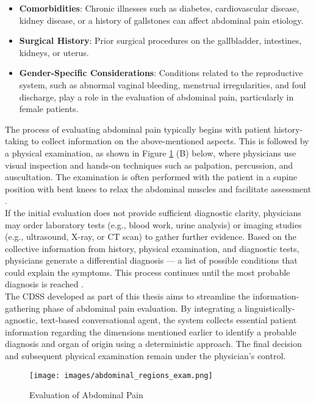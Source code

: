 \begin{itemize}
    \item \textcolor{TUMRed}{\textbf{Comorbidities}}: Chronic illnesses such as diabetes, cardiovascular disease, kidney disease, or a history of gallstones can affect abdominal pain etiology.
    \item \textcolor{TUMRed}{\textbf{Surgical History}}: Prior surgical procedures on the gallbladder, intestines, kidneys, or uterus.
    \item \textcolor{TUMRed}{\textbf{Gender-Specific Considerations}}: Conditions related to the reproductive system, such as abnormal vaginal bleeding, menstrual irregularities, and foul discharge, play a role in the evaluation of abdominal pain, particularly in female patients.
\end{itemize}
\noindent The process of evaluating abdominal pain typically begins with patient history-taking to collect information on the above-mentioned aspects. This is followed by a physical examination, as shown in Figure \ref{fig:abdominal_regions} (B) below, where physicians use visual inspection and hands-on techniques such as palpation, percussion, and auscultation. The examination is often performed with the patient in a supine position with bent knees to relax the abdominal muscles and facilitate assessment \cite{AbExm, cartwright2008evaluation}.\\[\baselineskip]

\noindent If the initial evaluation does not provide sufficient diagnostic clarity, physicians may order laboratory tests (e.g., blood work, urine analysis) or imaging studies (e.g., ultrasound, X-ray, or CT scan) to gather further evidence. Based on the collective information from history, physical examination, and diagnostic tests, physicians generate a differential diagnosis --- a list of possible conditions that could explain the symptoms. This process continues until the most probable diagnosis is reached \cite{ddCleveland}.\\[\baselineskip]

\noindent The CDSS developed as part of this thesis aims to streamline the information-gathering phase of abdominal pain evaluation. By integrating a linguistically-agnostic, text-based conversational agent, the system collects essential patient information regarding the dimensions mentioned earlier to identify a probable diagnosis and organ of origin using a deterministic approach. The final decision and subsequent physical examination remain under the physician's control.

\begin{figure}[h]
    \centering
    \texttt{[image: images/abdominal\_regions\_exam.png]}
    \caption{Evaluation of Abdominal Pain}
    \label{fig:abdominal_regions}
\end{figure}


